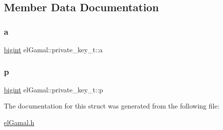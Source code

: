 \subsection{Member Data Documentation}
\mbox{\label{structelGamal_1_1private__key__t_a0e3d2e173ce62a47bf3adf23fe6de6ff}} 
\subsubsection{\texorpdfstring{a}{a}}
{\footnotesize\ttfamily \mbox{\hyperlink{namespaceelGamal_ab2883bf41ce8d738e2428c8ae81b0245}{bigint}} el\+Gamal\+::private\+\_\+key\+\_\+t\+::a}

\mbox{\label{structelGamal_1_1private__key__t_a9df42cc4041316be72eb435941933ffc}} 
\subsubsection{\texorpdfstring{p}{p}}
{\footnotesize\ttfamily \mbox{\hyperlink{namespaceelGamal_ab2883bf41ce8d738e2428c8ae81b0245}{bigint}} el\+Gamal\+::private\+\_\+key\+\_\+t\+::p}



The documentation for this struct was generated from the following file\+:\begin{DoxyCompactItemize}
\item 
\mbox{\hyperlink{elGamal_8h}{el\+Gamal.\+h}}\end{DoxyCompactItemize}
